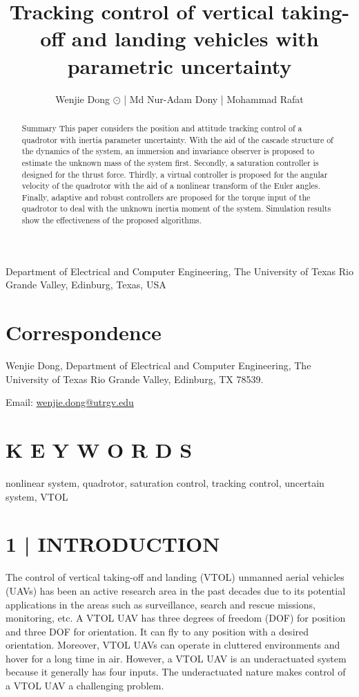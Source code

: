\documentclass[10pt]{article}
\title{Tracking control of vertical taking-off and landing vehicles with parametric uncertainty }
\author{Wenjie Dong $\odot$ | Md Nur-Adam Dony | Mohammad Rafat}
\date{}
\begin{document}
\maketitle
Department of Electrical and Computer Engineering, The University of Texas Rio Grande Valley, Edinburg, Texas, USA

\section{Correspondence}
Wenjie Dong, Department of Electrical and Computer Engineering, The University of Texas Rio Grande Valley, Edinburg, TX 78539.

Email: \href{mailto:wenjie.dong@utrgv.edu}{wenjie.dong@utrgv.edu}

\begin{abstract}
Summary This paper considers the position and attitude tracking control of a quadrotor with inertia parameter uncertainty. With the aid of the cascade structure of the dynamics of the system, an immersion and invariance observer is proposed to estimate the unknown mass of the system first. Secondly, a saturation controller is designed for the thrust force. Thirdly, a virtual controller is proposed for the angular velocity of the quadrotor with the aid of a nonlinear transform of the Euler angles. Finally, adaptive and robust controllers are proposed for the torque input of the quadrotor to deal with the unknown inertia moment of the system. Simulation results show the effectiveness of the proposed algorithms.
\end{abstract}

\section{K E Y W O R D S}
nonlinear system, quadrotor, saturation control, tracking control, uncertain system, VTOL

\section{1 | INTRODUCTION}
The control of vertical taking-off and landing (VTOL) unmanned aerial vehicles (UAVs) has been an active research area in the past decades due to its potential applications in the areas such as surveillance, search and rescue missions, monitoring, etc. A VTOL UAV has three degrees of freedom (DOF) for position and three DOF for orientation. It can fly to any position with a desired orientation. Moreover, VTOL UAVs can operate in cluttered environments and hover for a long time in air. However, a VTOL UAV is an underactuated system because it generally has four inputs. The underactuated nature makes control of a VTOL UAV a challenging problem.
\end{document}
